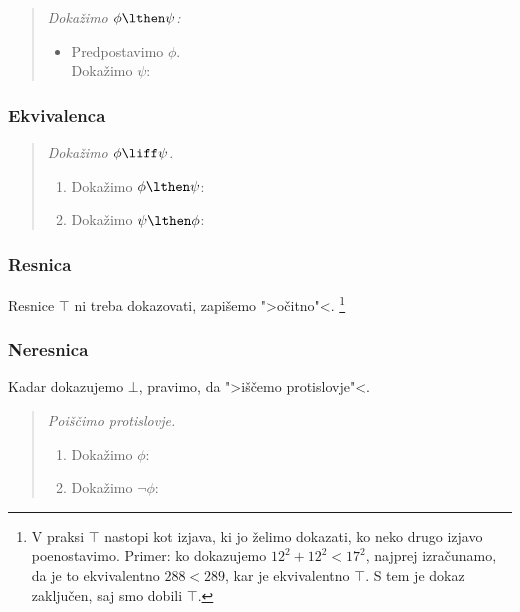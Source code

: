 \begin{quote}
  \sl
  Dokažimo $\phi \lthen \psi$:
  \begin{itemize}
  \item[] Predpostavimo $\phi$. \\
        Dokažimo $\psi$: \quad {}
  \end{itemize}
\end{quote}

\subsubsection{Ekvivalenca}

\begin{quote}
  \sl
  Dokažimo $\phi \liff \psi$.
  \begin{enumerate}
  \item Dokažimo $\phi \lthen \psi$: \quad {}
  \item Dokažimo $\psi \lthen \phi$: \quad {}
  \end{enumerate}
\end{quote}

\subsubsection{Resnica}

Resnice $\top$ ni treba dokazovati, zapišemo ">očitno"<. \footnote{
V praksi $\top$ nastopi kot izjava, ki jo želimo dokazati, ko neko drugo izjavo poenostavimo. Primer: ko dokazujemo
$12^2 + 12^2 < 17^2$, najprej izračunamo, da je to ekvivalentno $288 < 289$, kar je ekvivalentno $\top$. S tem je dokaz
zaključen, saj smo dobili $\top$.}

\subsubsection{Neresnica}

Kadar dokazujemo $\bot$, pravimo, da ">iščemo protislovje"<.

\begin{quote}
  \sl
  Poiščimo protislovje.
  \begin{enumerate}
  \item Dokažimo $\phi$: \quad {}
  \item Dokažimo $\lnot \phi$: \quad {}
  \end{enumerate}
\end{quote}

